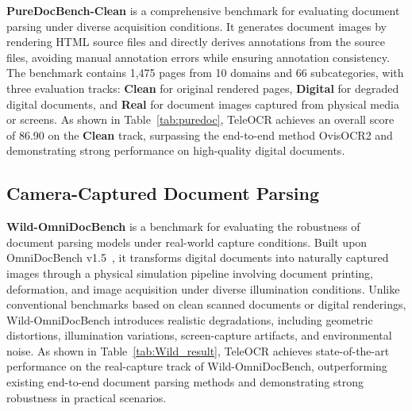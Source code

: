 \documentclass{fairmeta}
\begin{document}
\textbf{PureDocBench-Clean} is a comprehensive benchmark for evaluating document parsing under diverse acquisition conditions. It generates document images by rendering HTML source files and directly derives annotations from the source files, avoiding manual annotation errors while ensuring annotation consistency. The benchmark contains 1,475 pages from 10 domains and 66 subcategories, with three evaluation tracks: \textbf{Clean} for original rendered pages, \textbf{Digital} for degraded digital documents, and \textbf{Real} for document images captured from physical media or screens. As shown in Table~\ref{tab:puredoc}, TeleOCR achieves an overall score of 86.90 on the \textbf{Clean} track, surpassing the end-to-end method OvisOCR2 and demonstrating strong performance on high-quality digital documents.






\subsection{Camera-Captured Document Parsing}
\textbf{Wild-OmniDocBench} is a benchmark for evaluating the robustness of document parsing models under real-world capture conditions. Built upon OmniDocBench v1.5~\cite{ouyang2024omnidocbenchbenchmarkingdiversepdf}, it transforms digital documents into naturally captured images through a physical simulation pipeline involving document printing, deformation, and image acquisition under diverse illumination conditions. Unlike conventional benchmarks based on clean scanned documents or digital renderings, Wild-OmniDocBench introduces realistic degradations, including geometric distortions, illumination variations, screen-capture artifacts, and environmental noise. As shown in Table~\ref{tab:Wild_result}, TeleOCR achieves state-of-the-art performance on the real-capture track of Wild-OmniDocBench, outperforming existing end-to-end document parsing methods and demonstrating strong robustness in practical scenarios.
\end{document}
